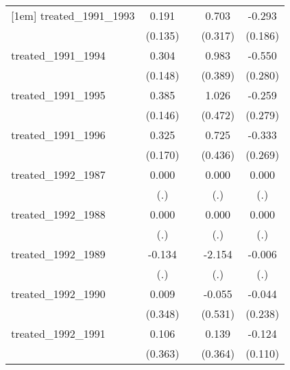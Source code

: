 {\begin{tabular}{l*{4}{c}}
[1em]
treated\_1991\_1993&       0.191         &                     &       0.703\sym{*}  &      -0.293         \\
            &     (0.135)         &                     &     (0.317)         &     (0.186)         \\
[1em]
treated\_1991\_1994&       0.304\sym{*}  &                     &       0.983\sym{*}  &      -0.550\sym{*}  \\
            &     (0.148)         &                     &     (0.389)         &     (0.280)         \\
[1em]
treated\_1991\_1995&       0.385\sym{**} &                     &       1.026\sym{*}  &      -0.259         \\
            &     (0.146)         &                     &     (0.472)         &     (0.279)         \\
[1em]
treated\_1991\_1996&       0.325         &                     &       0.725         &      -0.333         \\
            &     (0.170)         &                     &     (0.436)         &     (0.269)         \\
[1em]
treated\_1992\_1987&       0.000         &                     &       0.000         &       0.000         \\
            &         (.)         &                     &         (.)         &         (.)         \\
[1em]
treated\_1992\_1988&       0.000         &                     &       0.000         &       0.000         \\
            &         (.)         &                     &         (.)         &         (.)         \\
[1em]
treated\_1992\_1989&      -0.134         &                     &      -2.154         &      -0.006         \\
            &         (.)         &                     &         (.)         &         (.)         \\
[1em]
treated\_1992\_1990&       0.009         &                     &      -0.055         &      -0.044         \\
            &     (0.348)         &                     &     (0.531)         &     (0.238)         \\
[1em]
treated\_1992\_1991&       0.106         &                     &       0.139         &      -0.124         \\
            &     (0.363)         &                     &     (0.364)         &     (0.110)         \\

\end{tabular}}
